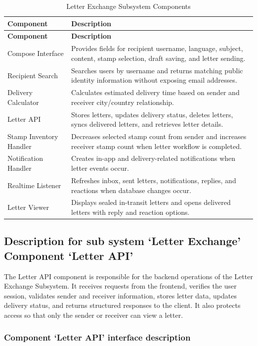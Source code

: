 ﻿\documentclass[12pt,a4paper]{report}
\begin{document}
\begin{longtable}{p{4cm} p{10cm}}
\caption{Letter Exchange Subsystem Components}
\label{tab:letter_exchange_components}\\
\toprule
\textbf{Component} & \textbf{Description} \\
\midrule
\endfirsthead
\toprule
\textbf{Component} & \textbf{Description} \\
\midrule
\endhead
Compose Interface & Provides fields for recipient username, language, subject, content, stamp selection, draft saving, and letter sending. \\
Recipient Search & Searches users by username and returns matching public identity information without exposing email addresses. \\
Delivery Calculator & Calculates estimated delivery time based on sender and receiver city/country relationship. \\
Letter API & Stores letters, updates delivery status, deletes letters, syncs delivered letters, and retrieves letter details. \\
Stamp Inventory Handler & Decreases selected stamp count from sender and increases receiver stamp count when letter workflow is completed. \\
Notification Handler & Creates in-app and delivery-related notifications when letter events occur. \\
Realtime Listener & Refreshes inbox, sent letters, notifications, replies, and reactions when database changes occur. \\
Letter Viewer & Displays sealed in-transit letters and opens delivered letters with reply and reaction options. \\
\bottomrule
\end{longtable}

\subsection{Description for sub system `Letter Exchange' Component `Letter API'}

The Letter API component is responsible for the backend operations of the Letter Exchange Subsystem. It receives requests from the frontend, verifies the user session, validates sender and receiver information, stores letter data, updates delivery status, and returns structured responses to the client. It also protects access so that only the sender or receiver can view a letter.

\subsubsection{Component `Letter API' interface description}
\end{document}
